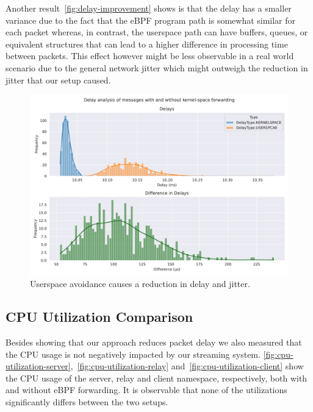 Another result~\autoref{fig:delay-improvement} shows is that the delay has a smaller variance due to the fact 
that the eBPF program path is somewhat similar for each packet whereas, in contrast, the userspace path can have 
buffers, queues, or equivalent structures that can lead to a higher difference in processing time between packets. 
This effect however might be less observable in a real world scenario due to the general network jitter which 
might outweigh the reduction in jitter that our setup caused.
\begin{figure}[htbp]
    \centering
    \includegraphics[width=\textwidth]{figures/04_testing_and_results/delays_small_packets_simple_userspace.pdf}
    \caption[Delay analysis of eBPF approach]{Userspace avoidance causes a reduction in delay and jitter.}\label{fig:delay-improvement}
\end{figure}

\subsection{CPU Utilization Comparison}
Besides showing that our approach reduces packet delay we also measured that the CPU usage is 
not negatively impacted by our streaming system.
\autoref{fig:cpu-utilization-server},~\ref{fig:cpu-utilization-relay} and~\ref{fig:cpu-utilization-client}
show the CPU usage of the server, relay and client namespace, respectively, both with and without eBPF forwarding.
It is observable that none of the utilizations significantly differs between the two setups. 

